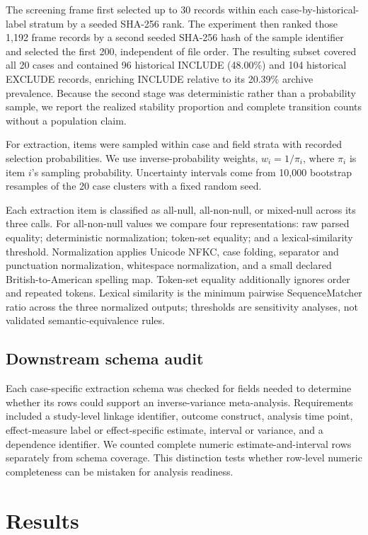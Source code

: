 \documentclass[acmsmall,anonymous,review]{acmart}
\begin{document}
The screening frame first selected up to 30 records within each case-by-historical-label stratum by a seeded SHA-256 rank. The experiment then ranked those 1,192 frame records by a second seeded SHA-256 hash of the sample identifier and selected the first 200, independent of file order. The resulting subset covered all 20 cases and contained 96 historical INCLUDE (48.00\%) and 104 historical EXCLUDE records, enriching INCLUDE relative to its 20.39\% archive prevalence. Because the second stage was deterministic rather than a probability sample, we report the realized stability proportion and complete transition counts without a population claim.

For extraction, items were sampled within case and field strata with recorded selection probabilities. We use inverse-probability weights, $w_i=1/\pi_i$, where $\pi_i$ is item $i$'s sampling probability. Uncertainty intervals come from 10,000 bootstrap resamples of the 20 case clusters with a fixed random seed.

Each extraction item is classified as all-null, all-non-null, or mixed-null across its three calls. For all-non-null values we compare four representations: raw parsed equality; deterministic normalization; token-set equality; and a lexical-similarity threshold. Normalization applies Unicode NFKC, case folding, separator and punctuation normalization, whitespace normalization, and a small declared British-to-American spelling map. Token-set equality additionally ignores order and repeated tokens. Lexical similarity is the minimum pairwise SequenceMatcher ratio across the three normalized outputs; thresholds are sensitivity analyses, not validated semantic-equivalence rules.

\subsection{Downstream schema audit}

Each case-specific extraction schema was checked for fields needed to determine whether its rows could support an inverse-variance meta-analysis. Requirements included a study-level linkage identifier, outcome construct, analysis time point, effect-measure label or effect-specific estimate, interval or variance, and a dependence identifier. We counted complete numeric estimate-and-interval rows separately from schema coverage. This distinction tests whether row-level numeric completeness can be mistaken for analysis readiness.

\section{Results}
\end{document}
